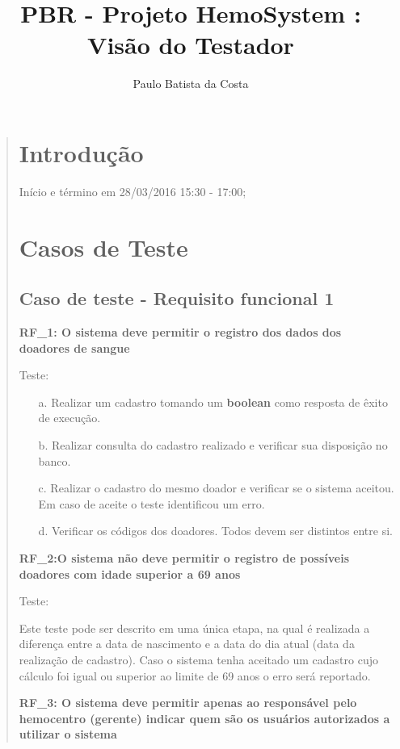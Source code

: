 \documentclass[12pt,a4paper]{report}
\author{Paulo Batista da Costa}
\title{PBR - Projeto HemoSystem  : Visão do Testador}
\begin{document}
\maketitle
\tableofcontents
\begin{quotation}
\newpage
\section{Introdução}
Início e término em 28/03/2016 15:30 - 17:00;
\section{Casos de Teste}
\subsection{Caso de teste - Requisito funcional 1}

\textbf{RF\_1: O sistema deve permitir o registro dos dados dos doadores de sangue}

Teste:
\begin{itemize}
\item[a.] Realizar um cadastro tomando um \textbf{boolean} como resposta de êxito de execução.
\item[b.] Realizar consulta do cadastro realizado e verificar sua disposição no banco.
\item[c.] Realizar o cadastro do mesmo doador e verificar se o sistema aceitou. Em caso de aceite o teste identificou um erro. 
\item[d.] Verificar os códigos dos doadores. Todos devem ser distintos entre si. 
\end{itemize}
\textbf{RF\_2:O sistema não deve permitir o registro de possíveis doadores com idade superior a 69 anos}

Teste:

Este teste pode ser descrito em uma única etapa, na qual é realizada a diferença entre a data de nascimento e a data do dia atual (data da realização de cadastro). Caso o sistema tenha aceitado um cadastro cujo cálculo foi igual ou superior ao limite de 69 anos o erro será reportado.


\textbf{RF\_3: O sistema deve permitir apenas ao responsável pelo hemocentro (gerente) indicar quem são os usuários autorizados a utilizar o sistema}


\end{quotation}
\end{document}
